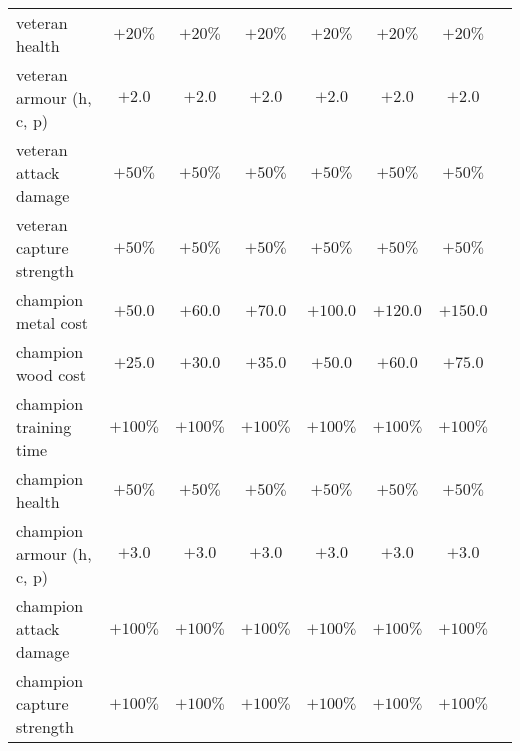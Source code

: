 \documentclass{article}
\begin{document}
\begin{tabular}{l|ccccccc}
veteran health             &  $+20\%$ &  $+20\%$ &  $+20\%$ &  $+20\%$ &  $+20\%$ &  $+20\%$ \\
veteran armour (h, c, p)   &   $+2.0$ &   $+2.0$ &   $+2.0$ &   $+2.0$ &   $+2.0$ &   $+2.0$ \\
veteran attack damage      &  $+50\%$ &  $+50\%$ &  $+50\%$ &  $+50\%$ &  $+50\%$ &  $+50\%$ \\
veteran capture strength   &  $+50\%$ &  $+50\%$ &  $+50\%$ &  $+50\%$ &  $+50\%$ &  $+50\%$ \\
\hline
champion metal cost        &  $+50.0$ &  $+60.0$ &  $+70.0$ & $+100.0$ & $+120.0$ & $+150.0$ \\
champion wood cost         &  $+25.0$ &  $+30.0$ &  $+35.0$ &  $+50.0$ &  $+60.0$ &  $+75.0$ \\
champion training time     & $+100\%$ & $+100\%$ & $+100\%$ & $+100\%$ & $+100\%$ & $+100\%$ \\
champion health            &  $+50\%$ &  $+50\%$ &  $+50\%$ &  $+50\%$ &  $+50\%$ &  $+50\%$ \\
champion armour (h, c, p)  &   $+3.0$ &   $+3.0$ &   $+3.0$ &   $+3.0$ &   $+3.0$ &   $+3.0$ \\
champion attack damage     & $+100\%$ & $+100\%$ & $+100\%$ & $+100\%$ & $+100\%$ & $+100\%$ \\
champion capture strength  & $+100\%$ & $+100\%$ & $+100\%$ & $+100\%$ & $+100\%$ & $+100\%$ \\
\end{tabular}
\end{document}
